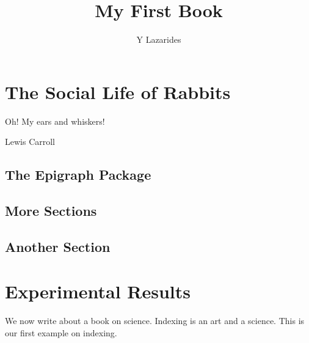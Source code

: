 \documentclass{book}
\title{My First Book}
\author{Y Lazarides}
\begin{document}
\maketitle
\tableofcontents

\chapter{The Social Life of Rabbits}
\epigraph{Oh!  My ears and whiskers!}%
         {Lewis Carroll}


\section{The Epigraph Package}
\lipsum[1-30]
\section{More Sections}
\lipsum



\section{Another Section}
\lipsum
\appendix
\chapter{Experimental Results}
We now write about a book on science. Indexing is an
art and a science. This is our first example on indexing.

\printindex
\end{document}
